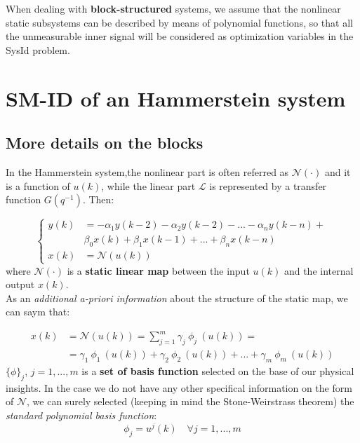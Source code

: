 \textsf{
When dealing with \textbf{block-structured} systems, we assume that the nonlinear static subsystems can be described by means of polynomial functions, so that all the unmeasurable inner signal will be considered as optimization variables in the SysId problem. }

\section{SM-ID of an Hammerstein system}
\subsection{
    More details on the blocks
}
In the Hammerstein system,the nonlinear part is often referred as $\mathcal{N}(\cdot)$ and it is a function of $u(k)$, while the linear part $\mathcal{L}$ is represented by a transfer function $G(q^{-1})$. Then: 

\begin{equation}\label{eq:hammer}
    \begin{cases}
        y(k)&=-\alpha_1{y(k-2)}-\alpha_2{y(k-2)}-...-\alpha_n{y(k-n)}+\\
        &\beta_0{x(k)}+\beta_1{x(k-1)}+...+\beta_n{x(k-n)}\\
        x(k)&=\mathcal{N}(u(k))
    \end{cases}
\end{equation}
where $\mathcal{N}(\cdot)$ is a \textbf{static linear map} between the input $u(k)$ and the internal output $x(k)$.\\
As an \textit{additional a-priori information} about the structure of the static map, we can saym that:

\begin{equation}
    \begin{aligned}
        x(k)&=\mathcal{N}(u(k))=\sum_{j=1}^m {\gamma_j \ \phi_j\ (u(k)) }=\\
        &=\gamma_1\ {\phi_1\ (u(k))}+\gamma_2 \ {\phi_2\ (u(k))}+...+\gamma_m\ {\phi_m\ (u(k))}
    \end{aligned}
\end{equation}
$\{\phi\}_j$, $j=1,...,m$ is a \textbf{set of basis function} selected on the base of our physical insights. In the case we do not have any other specifical information on the form of $\mathcal{N}$, we can surely selected (keeping in mind the Stone-Weirstrass theorem) the \textit{standard polynomial basis function}:
\begin{equation*}
    \phi_j=u^j(k) \quad   \forall j=1,...,m
\end{equation*}    

